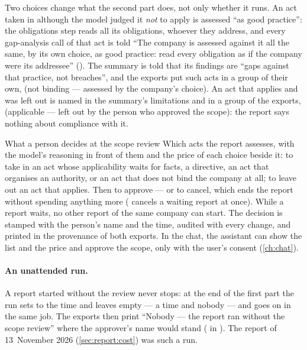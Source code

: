 Two choices change what the second part does, not only whether it runs. An act taken in
although the model judged it \emph{not} to apply is assessed \enquote{as good practice}: the
obligations step reads all its obligations, whoever they address, and every gap-analysis call
of that act is told \enquote{The company is assessed against it all the same, by its own
choice, as good practice: read every obligation as if the company were its addressee}
(). The summary is told that its findings are \enquote{gaps against that
practice, not breaches}, and the exports put such acts in a group of their own,  (not binding --- assessed by the company's choice). An act
that applies and was left out is named in the summary's limitations and in a group of the
exports,  (applicable --- left
out by the person who approved the scope): the report says nothing about compliance with it.

\begin{humanbox}{What a person decides at the scope review}
Which acts the report assesses, with the model's reasoning in front of them and the price of
each choice beside it: to take in an act whose applicability waits for facts, a directive, an
act that organises an authority, or an act that does not bind the company at all; to leave out
an act that applies. Then to approve --- or to cancel, which ends the report without spending
anything more ( cancels a waiting report at once). While a
report waits, no other report of the same company can start. The decision is stamped with the
person's name and the time, audited with every change, and printed in the provenance of both
exports. In the chat, the assistant can show the list and the price and approve the scope,
only with the user's consent (\cref{ch:chat}).
\end{humanbox}

\paragraph{An unattended run.} A report started without the review never stops: at the end of
the first part the run sets  to the time and leaves
 empty --- a time and nobody --- and goes on in the same job. The
exports then print \enquote{Nobody --- the report ran without the scope review} where the
approver's name would stand ( in ). The report
of 13~November 2026 (\cref{sec:report:cost}) was such a run.

